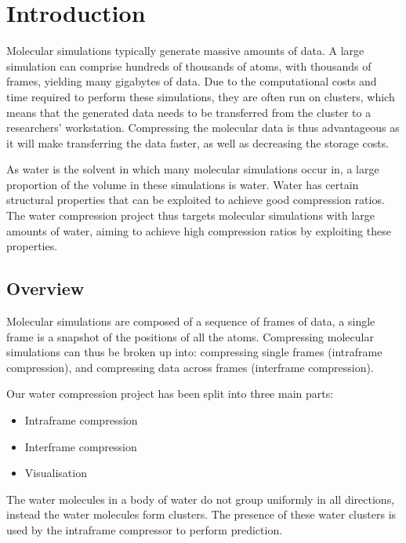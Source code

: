 \graphicspath{{./introduction/}}

\chapter{Introduction}
\label{cha:introduction}

Molecular simulations typically generate massive amounts of data. A large
simulation can comprise hundreds of thousands of atoms, with thousands of
frames, yielding many gigabytes of data. Due to the computational costs and
time required to perform these simulations, they are often run on clusters,
which means that the generated data needs to be transferred from the cluster to
a researchers' workstation. Compressing the molecular data is thus advantageous
as it will make transferring the data faster, as well as decreasing the storage
costs.

As water is the solvent in which many molecular simulations occur in, a large
proportion of the volume in these simulations is water. Water has certain
structural properties that can be exploited to achieve good compression ratios.
The water compression project thus targets molecular simulations with large
amounts of water, aiming to achieve high compression ratios by exploiting these
properties.

\section{Overview}
\label{sec:introduction_overview}

Molecular simulations are composed of a sequence of frames of data, a single
frame is a snapshot of the positions of all the atoms. Compressing molecular
simulations can thus be broken up into: compressing single frames (intraframe
compression), and compressing data across frames (interframe compression).

Our water compression project has been split into three main parts:

\begin{itemize}
  \item Intraframe compression
  \item Interframe compression
  \item Visualisation
\end{itemize}

The water molecules in a body of water do not group uniformly in all
directions, instead the water molecules form clusters. The presence of these
water clusters is used by the intraframe compressor to perform prediction.

